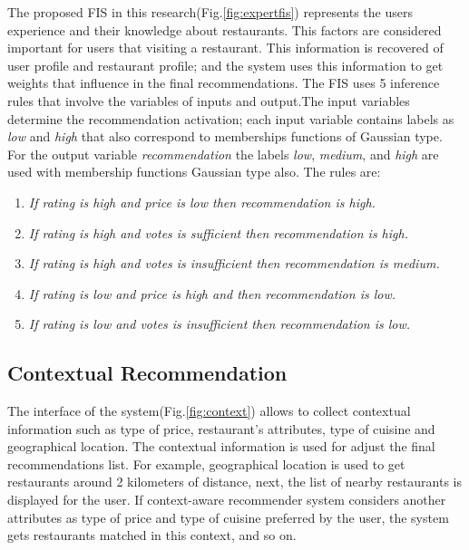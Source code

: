 The proposed FIS in this research(Fig.\ref{fig:expertfis}) represents the users
experience and their knowledge about restaurants. This factors are considered
important  for users that visiting a restaurant. This information is recovered
of user profile and restaurant profile; and the system uses this information to
get weights that influence in the final recommendations. The FIS uses 5
inference rules that involve the variables of inputs and output.The input
variables determine the recommendation activation; each input variable contains
labels as \textit{low} and \textit{high} that also correspond to memberships
functions of Gaussian type. For the output variable \textit{recommendation} the
labels \textit{low}, \textit{medium}, and \textit{high} are used with membership
functions Gaussian type also. The rules are:

\begin{enumerate} 
\item \textit{If rating is high and price is low then recommendation is high.}
\item \textit{If rating is high and votes is sufficient then recommendation is high.}
\item \textit{If rating is high and votes is insufficient then recommendation is medium.}
\item \textit{If rating is low and price is high and then recommendation is low.} 
\item \textit{If rating is low and votes is insufficient then recommendation is low.}
\end{enumerate} 

\begin{figure*}
\captionsetup{justification=centering,margin=2cm}
\centering
{}
\caption{Fuzzy Inference System of expert.}
\label{fig:expertfis}     
\end{figure*}

\subsection{Contextual Recommendation} \label{sec:3.4} 

The interface of the system(Fig.\ref{fig:context})  allows to collect contextual
information such as type of price, restaurant's attributes, type of cuisine and
geographical location. The contextual information is used for adjust the final
recommendations list. For example, geographical location is used to get
restaurants around 2 kilometers of distance, next, the list of nearby
restaurants is displayed for the user. If context-aware recommender system
considers another attributes as type of price and type of cuisine preferred by
the user, the system gets restaurants matched in this context, and so on.

